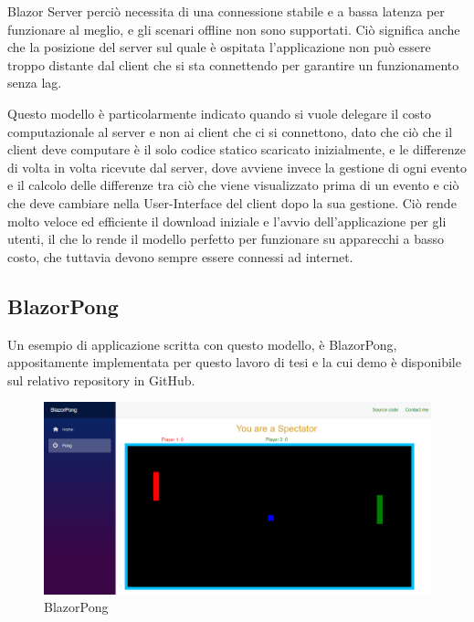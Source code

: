 Blazor Server perci\`o necessita di una connessione stabile e a bassa latenza per funzionare al meglio, e gli scenari offline non sono supportati.
Ci\`o significa anche che la posizione del server sul quale \`e ospitata l'applicazione non pu\`o essere troppo distante dal client che si sta connettendo per garantire un funzionamento senza lag.

Questo modello \`e particolarmente indicato quando si vuole delegare il costo computazionale al server e non ai client che ci si connettono, dato che ci\`o che il client deve computare \`e il solo codice statico scaricato inizialmente, e le differenze di volta in volta ricevute dal server, dove avviene invece la gestione di ogni evento e il calcolo delle differenze tra ci\`o che viene visualizzato prima di un evento e ci\`o che deve cambiare nella User-Interface del client dopo la sua gestione.
Ci\`o rende molto veloce ed efficiente il download iniziale e l'avvio dell'applicazione per gli utenti, il che lo rende il modello perfetto per funzionare su apparecchi a basso costo, che tuttavia devono sempre essere connessi ad internet.

\subsection{BlazorPong }\label{sez:bpong}
Un esempio di applicazione scritta con questo modello, \`e BlazorPong, appositamente implementata per questo lavoro di tesi e la cui demo \`e disponibile sul relativo repository in GitHub\cite{blazorPong}.

\begin{figure}[H]
	\centerline{\includegraphics[scale=0.3]{figure/BlazorPong.PNG}}
	\caption{BlazorPong}
	\label{fig:BlazorPong}
\end{figure}

